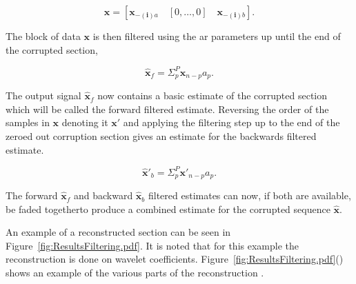 \begin{equation}\label{eq:RestBasicModelFilterZeros}
\boldsymbol{x} = \left[ \boldsymbol{x}_{\boldsymbol{-(i)}a}\quad \left[0,\ldots,0\right] \quad\boldsymbol{x}_{\boldsymbol{-(i)}b} \right].
\end{equation}

The block of data $\boldsymbol{x}$ is then filtered using the \DIFdelbegin {}\DIFdelend \DIFaddbegin \gls{ar} \DIFaddend parameters up until the end of the corrupted section,

\begin{equation}\label{eq:RestBasicModelFilterEQ}
\boldsymbol{\hat{x}}_f = \Sigma_p^P \boldsymbol{x}_{n-p}a_p.
\end{equation}

The output signal $\boldsymbol{\hat{x}}_f$ now contains a basic estimate of the corrupted section which will be called the forward filtered estimate. Reversing the order of the samples in $\boldsymbol{x}$ denoting it $\boldsymbol{x'}$ and applying the filtering step up to the end of the zeroed out corruption section gives an estimate for the backwards filtered estimate.

\begin{equation}\label{eq:RestBasicModelFilterEQR}
\boldsymbol{\hat{x}'}_b = \Sigma_p^P \boldsymbol{x'}_{n-p}a_p.
\end{equation}

The forward $\boldsymbol{\hat{x}}_f$ and backward $\boldsymbol{\hat{x}}_b$ filtered estimates can now, if both are available, be faded together\DIFaddbegin {}\DIFaddend to produce a combined estimate for the corrupted sequence $\boldsymbol{\hat{x}}$.

An example of a reconstructed section can be seen in Figure~\ref{fig:ResultsFiltering.pdf}. It is noted that for this example the reconstruction is done on wavelet coefficients. Figure~\ref{fig:ResultsFiltering.pdf}(\DIFdelbegin {}\DIFdelend \DIFaddbegin {}\DIFaddend ) shows an example of the various parts of the reconstruction \DIFaddbegin {}\DIFaddend .

